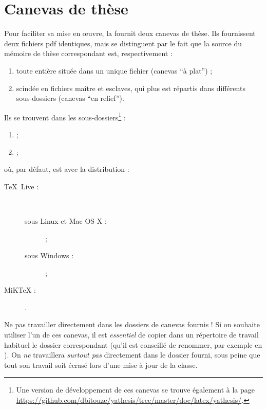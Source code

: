 \chapter{Canevas de thèse}\label{cha:canevas}

Pour faciliter sa mise en œuvre, la \yatcl fournit deux canevas de thèse. Ils
fournissent deux fichiers \gls{pdf} identiques, mais se distinguent par le fait
que la source  du mémoire de thèse correspondant est,
respectivement :
\begin{enumerate}
\item toute entière située dans un unique fichier (canevas \enquote{à plat}) ;
\item scindée en fichiers maître et esclaves, qui plus est répartis dans
  différents sous-dossiers (canevas \enquote{en relief}).
\end{enumerate}
Ils se trouvent dans les sous-dossiers\footnote{Une version de
  développement de ces canevas se trouve également à la page
  \url{https://github.com/dbitouze/yathesis/tree/master/doc/latex/yathesis/}.} :
\begin{enumerate}
\item {} ;
\item {} ;
\end{enumerate}
où, par défaut,  est avec la distribution :
\begin{description}
\item[\TeX{}~Live :]\
  \begin{description}
  \item[sous Linux et Mac OS X :] \unixtldirectory\tldistdirectory\versiontl ;
  \item[sous Windows :] \wintldirectory\tldistdirectory\versiontl ;
  \end{description}
\item[MiK\TeX{} :] \miktexdistdirectory.
\end{description}

\begin{dbwarning}{Ne pas travailler directement dans les dossiers de canevas
    fournis !}{}
  Si on souhaite utiliser l'un de ces canevas, il est \emph{essentiel} de
  copier dans un répertoire de travail habituel le dossier correspondant (qu'il
  est conseillé de renommer, par exemple en \directory{these}). On \emph{ne}
  travaillera \emph{surtout pas} directement dans le dossier fourni, sous peine
  que tout son travail soit écrasé lors d'une mise à jour de la classe.
\end{dbwarning}

